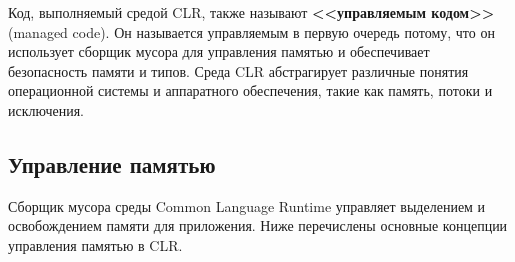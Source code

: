 Код, выполняемый средой CLR, также называют \textbf{<<управляемым кодом>>} (managed code).
Он называется управляемым в первую очередь потому, что он использует сборщик мусора для управления памятью и обеспечивает безопасность памяти и типов. Среда CLR абстрагирует различные понятия операционной системы и аппаратного обеспечения, такие как память, потоки и исключения. \cite{dotnet_code}



\subsection{Управление памятью}

Сборщик мусора среды Common Language Runtime управляет выделением и освобождением памяти для приложения. Ниже перечислены основные концепции управления памятью в CLR. \cite{dotnet_gc}

